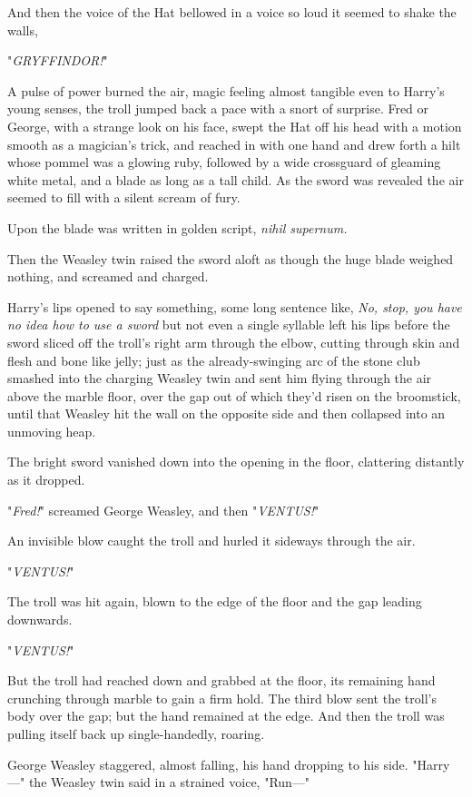And then the voice of the Hat bellowed in a voice so loud it seemed to shake 
the walls,

"\emph{GRYFFINDOR!}"

A pulse of power burned the air, magic feeling almost tangible even to Harry's 
young senses, the troll jumped back a pace with a snort of surprise. Fred or 
George, with a strange look on his face, swept the Hat off his head with a 
motion smooth as a magician's trick, and reached in with one hand and drew 
forth a hilt whose pommel was a glowing ruby, followed by a wide crossguard of 
gleaming white metal, and a blade as long as a tall child. As the sword was 
revealed the air seemed to fill with a silent scream of fury.

Upon the blade was written in golden script, \emph{nihil supernum.}

Then the Weasley twin raised the sword aloft as though the huge blade weighed 
nothing, and screamed and charged.

Harry's lips opened to say something, some long sentence like, \emph{No, stop, 
you have no idea how to use a sword} but not even a single syllable left his 
lips before the sword sliced off the troll's right arm through the elbow, 
cutting through skin and flesh and bone like jelly; just as the 
already-swinging arc of the stone club smashed into the charging Weasley twin 
and sent him flying through the air above the marble floor, over the gap out of 
which they'd risen on the broomstick, until that Weasley hit the wall on the 
opposite side and then collapsed into an unmoving heap.

The bright sword vanished down into the opening in the floor, clattering 
distantly as it dropped.

"\emph{Fred!}" screamed George Weasley, and then "\emph{VENTUS!}"

An invisible blow caught the troll and hurled it sideways through the air.

"\emph{VENTUS!}"

The troll was hit again, blown to the edge of the floor and the gap leading 
downwards.

"\emph{VENTUS!}"

But the troll had reached down and grabbed at the floor, its remaining hand 
crunching through marble to gain a firm hold. The third blow sent the troll's 
body over the gap; but the hand remained at the edge. And then the troll was 
pulling itself back up single-handedly, roaring.

George Weasley staggered, almost falling, his hand dropping to his side. 
"Harry---" the Weasley twin said in a strained voice, "Run---"


